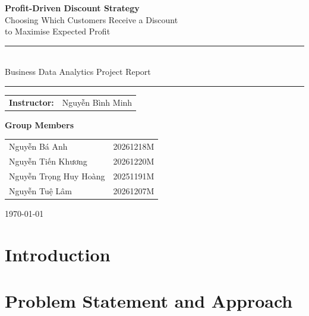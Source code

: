 \documentclass[a4paper,11pt]{report}
\begin{document}
\begin{titlepage}
    \centering
    \vspace*{3cm}

    {\LARGE\bfseries Profit-Driven Discount Strategy}\\[0.4cm]
    {\Large Choosing Which Customers Receive a Discount\\to Maximise Expected Profit}\\[2cm]

    \rule{0.8\linewidth}{0.6pt}\\[0.5cm]
    {\large Business Data Analytics Project Report}\\[0.2cm]
    \rule{0.8\linewidth}{0.6pt}

    \vfill

    \begin{tabular}{ll}
        \textbf{Instructor:} & Nguyễn Bình Minh \\
    \end{tabular}

    \vspace{0.8cm}

    \textbf{Group Members}\\[0.3cm]
    \begin{tabular}{ll}
        Nguyễn Bá Anh & 20261218M \\
        Nguyễn Tiến Khương & 20261220M \\
        Nguyễn Trọng Huy Hoàng & 20251191M \\
        Nguyễn Tuệ Lâm & 20261207M \\
    \end{tabular}

    \vspace{1cm}
    {\large \today}

    \vspace*{1cm}
\end{titlepage}

\tableofcontents

\chapter{Introduction}
\label{ch:introduction}


\chapter{Problem Statement and Approach}
\label{ch:problem-approach}

\end{document}
